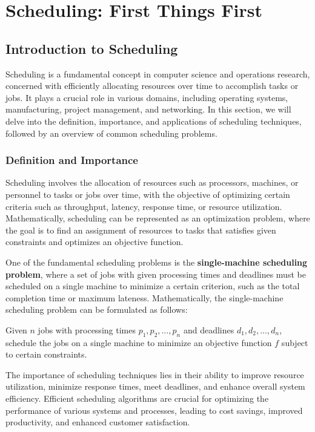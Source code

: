 \documentclass[12pt]{book} %
\begin{document}
\chapter{Scheduling: First Things First}

\section{Introduction to Scheduling}

Scheduling is a fundamental concept in computer science and operations research, concerned with efficiently allocating resources over time to accomplish tasks or jobs. It plays a crucial role in various domains, including operating systems, manufacturing, project management, and networking. In this section, we will delve into the definition, importance, and applications of scheduling techniques, followed by an overview of common scheduling problems.

\subsection{Definition and Importance}

Scheduling involves the allocation of resources such as processors, machines, or personnel to tasks or jobs over time, with the objective of optimizing certain criteria such as throughput, latency, response time, or resource utilization. Mathematically, scheduling can be represented as an optimization problem, where the goal is to find an assignment of resources to tasks that satisfies given constraints and optimizes an objective function.

One of the fundamental scheduling problems is the \textbf{single-machine scheduling problem}, where a set of jobs with given processing times and deadlines must be scheduled on a single machine to minimize a certain criterion, such as the total completion time or maximum lateness. Mathematically, the single-machine scheduling problem can be formulated as follows:

Given \(n\) jobs with processing times \(p_1, p_2, \ldots, p_n\) and deadlines \(d_1, d_2, \ldots, d_n\), schedule the jobs on a single machine to minimize an objective function \(f\) subject to certain constraints.

The importance of scheduling techniques lies in their ability to improve resource utilization, minimize response times, meet deadlines, and enhance overall system efficiency. Efficient scheduling algorithms are crucial for optimizing the performance of various systems and processes, leading to cost savings, improved productivity, and enhanced customer satisfaction.
\end{document}
